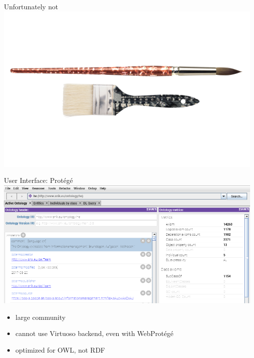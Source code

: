 \documentclass[aspectratio=1610]{beamer}
\begin{document}
\begin{frame}{Unfortunately not}
\centering
\includegraphics[width=0.9\paperwidth]{img/complicated.png}
\end{frame}

\begin{frame}{User Interface: Prot\'eg\'e}
\centering
\includegraphics[width=0.6\paperwidth]{img/protege.png}
\begin{itemize}
\item large community
\item cannot use Virtuoso backend, even with WebProt\'eg\'e
\item optimized for OWL, not RDF
\end{itemize}
\end{frame}
\end{document}
